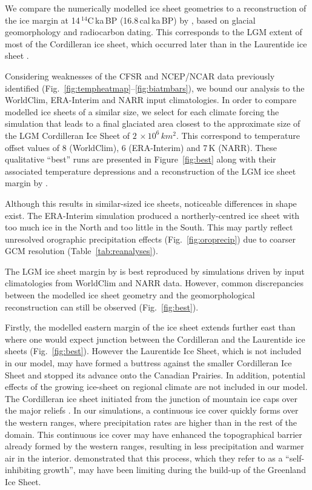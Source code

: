We compare the numerically modelled ice sheet geometries to a reconstruction of the ice margin at 14\,$^{14}$C\,ka\,BP (16.8\,cal\,ka\,BP) by \citet{dyke-2004}, based on glacial geomorphology and radiocarbon dating. This corresponds to the LGM extent of most of the Cordilleran ice sheet, which occurred later than in the Laurentide ice sheet \citep{dyke-2004}.

Considering weaknesses of the CFSR and NCEP/NCAR data previously identified (Fig.~\ref{fig:tempheatmap}--\ref{fig:biatmbars}), we bound our analysis to the  WorldClim, ERA-Interim and NARR input climatologies. In order to compare modelled ice sheets of a similar size, we select for each climate forcing the simulation that leads to a final glaciated area closest to the approximate size of the LGM Cordilleran Ice Sheet of $2\,\times10^6\,\unit{km^2}$. This correspond to temperature offset values of 8 (WorldClim), 6 (ERA-Interim) and 7\,K (NARR). These qualitative “best” runs are presented in Figure~\ref{fig:best} along with their associated temperature depressions and a reconstruction of the LGM ice sheet margin by \citet{dyke-2004}.

Although this results in similar-sized ice sheets, noticeable differences in shape exist. The ERA-Interim simulation produced a northerly-centred ice sheet with too much ice in the North and too little in the South. This may partly reflect unresolved orographic precipitation effects (Fig.~\ref{fig:oroprecip}) due to coarser GCM resolution (Table~\ref{tab:reanalyses}).

The LGM ice sheet margin by \citet{dyke-2004} is best reproduced by simulations driven by input climatologies from WorldClim and NARR data. However, common discrepancies between the modelled ice sheet geometry and the geomorphological reconstruction can still be observed (Fig.~\ref{fig:best}).

Firstly, the modelled eastern margin of the ice sheet extends further east than where one would expect junction between the Cordilleran and the Laurentide ice sheets (Fig.~\ref{fig:best}). However the Laurentide Ice Sheet, which is not included in our model, may have formed a buttress against the smaller Cordilleran Ice Sheet and stopped its advance onto the Canadian Prairies. In addition, potential effects of the growing ice-sheet on regional climate are not included in our model. The Cordilleran ice sheet initiated from the junction of mountain ice caps over the major reliefs \citep{clague-1989}. In our simulations, a continuous ice cover quickly forms over the western ranges, where precipitation rates are higher than in the rest of the domain. This continuous ice cover may have enhanced the topographical barrier already formed by the western ranges, resulting in less precipitation and warmer air in the interior. \citet{langen-etal-2012} demonstrated that this process, which they refer to as a ``self-inhibiting growth'', may have been limiting during the build-up of the Greenland Ice Sheet.

